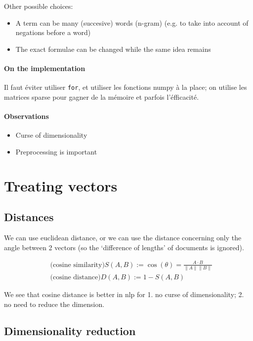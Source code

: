 \documentclass{article}
\begin{document}
Other possible choices:

\begin{itemize}
  \item A term can be many (succesive) words (n-gram) (e.g. to
  take into account of negations before a word)
  \item The exact formulae can be changed while the same idea remains
\end{itemize}

\paragraph{On the implementation} Il faut éviter utiliser \verb|for|, et
utiliser les fonctions numpy à la place; on utilise les matrices sparse pour
gagner de la mémoire et parfois l'éfficacité.

\paragraph{Observations}
\begin{itemize}
  \item Curse of dimensionality
  \item Preprocessing is important
\end{itemize}

\section{Treating vectors}

\subsection{Distances}

We can use euclidean distance, or we can use the distance concerning
only the angle between 2 vectors (so the `difference of lengths' of documents
is ignored).

$$
\begin{aligned}
&\text{(cosine similarity)}S(A, B) :=
\cos (\theta)=\frac{A \cdot B}{\|A\|\|B\|}\\
&\text{(cosine distance)}D(A, B) :=1-S(A, B)
\end{aligned}
$$

We see that cosine distance is better in nlp for 1. no curse of dimensionality; 2. no
need to reduce the dimension.

\subsection{Dimensionality reduction}
\end{document}
